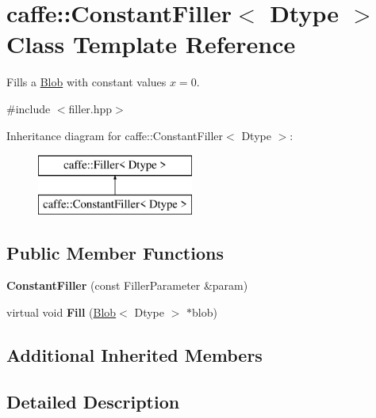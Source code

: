 \hypertarget{classcaffe_1_1ConstantFiller}{}\section{caffe\+:\+:Constant\+Filler$<$ Dtype $>$ Class Template Reference}
\label{classcaffe_1_1ConstantFiller}


Fills a \hyperlink{classcaffe_1_1Blob}{Blob} with constant values $ x = 0 $.  




{\ttfamily \#include $<$filler.\+hpp$>$}

Inheritance diagram for caffe\+:\+:Constant\+Filler$<$ Dtype $>$\+:\begin{figure}[H]
\begin{center}
\leavevmode
\includegraphics[height=2.000000cm]{classcaffe_1_1ConstantFiller}
\end{center}
\end{figure}
\subsection*{Public Member Functions}
\begin{DoxyCompactItemize}
\item 
{\bfseries Constant\+Filler} (const Filler\+Parameter \&param)\hypertarget{classcaffe_1_1ConstantFiller_ac6bd25bc764935cb5261d0279a772001}{}\label{classcaffe_1_1ConstantFiller_ac6bd25bc764935cb5261d0279a772001}

\item 
virtual void {\bfseries Fill} (\hyperlink{classcaffe_1_1Blob}{Blob}$<$ Dtype $>$ $\ast$blob)\hypertarget{classcaffe_1_1ConstantFiller_a411cf44b177109c388c0b34c906f4e8e}{}\label{classcaffe_1_1ConstantFiller_a411cf44b177109c388c0b34c906f4e8e}

\end{DoxyCompactItemize}
\subsection*{Additional Inherited Members}


\subsection{Detailed Description}
